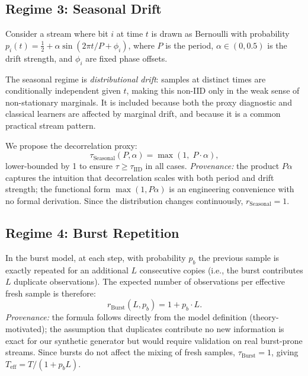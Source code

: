 \documentclass[sensors,article,submit,pdftex,moreauthors]{Definitions/mdpi}
\newcommand{\Teff}{T_{\mathrm{eff}}}
\begin{document}
\subsection{Regime 3: Seasonal Drift}

Consider a stream where bit $i$ at time $t$ is drawn as Bernoulli with probability $p_i(t) = \tfrac{1}{2} + \alpha \sin(2\pi t/P + \phi_i)$, where $P$ is the period, $\alpha \in (0, 0.5)$ is the drift strength, and $\phi_i$ are fixed phase offsets.

The seasonal regime is \emph{distributional drift}: samples at distinct times are conditionally independent given $t$, making this non\nobreakdash-IID only in the weak sense of non-stationary marginals. It is included because both the proxy diagnostic and classical learners are affected by marginal drift, and because it is a common practical stream pattern.

We propose the decorrelation proxy:
\begin{equation}
    \tau_{\text{Seasonal}}(P, \alpha) = \max(1,\; P \cdot \alpha),
    \label{eq:tau_seasonal}
\end{equation}
lower-bounded by 1 to ensure $\tau \geq \tau_{\text{IID}}$ in all cases. \emph{Provenance:} the product $P\alpha$ captures the intuition that decorrelation scales with both period and drift strength; the functional form $\max(1, P\alpha)$ is an engineering convenience with no formal derivation. Since the distribution changes continuously, $r_{\text{Seasonal}} = 1$.

\subsection{Regime 4: Burst Repetition}

In the burst model, at each step, with probability $p_b$ the previous sample is exactly repeated for an additional $L$ consecutive copies (i.e., the burst contributes $L$ duplicate observations). The expected number of observations per effective fresh sample is therefore:
\begin{equation}
    r_{\text{Burst}}(L, p_b) = 1 + p_b \cdot L.
    \label{eq:r_burst}
\end{equation}
\emph{Provenance:} the formula follows directly from the model definition (theory\nobreakdash-motivated); the assumption that duplicates contribute no new information is exact for our synthetic generator but would require validation on real burst-prone streams. Since bursts do not affect the mixing of fresh samples, $\tau_{\text{Burst}} = 1$, giving $\Teff = T/(1 + p_b L)$.
\end{document}

